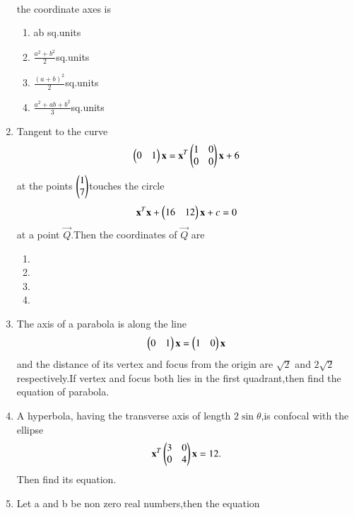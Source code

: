 \begin{enumerate}[label=\arabic*.,ref=\thesubsection.\theenumi]
\begin{align}
    \end{align} the coordinate axes is 
    \begin{enumerate}
    \item ab sq.units
    \item $\frac{a^2+b^2}{2}$sq.units 
    \item $\frac{(a+b)^2}{2}$sq.units 
    \item $\frac{a^2+ab+b^2}{3}$sq.units
    \end{enumerate}
\item Tangent to the curve
    \begin{align}
    \begin{pmatrix}0&1\end{pmatrix}\mathbf{x}= \mathbf{x}^T\begin{pmatrix}1 & 0 \\0 & 0\end{pmatrix}\mathbf{x}+ 6
    \end{align} 
    at the points $\begin{pmatrix}1 \\ 7\end{pmatrix}$touches the circle 
    \begin{align}
    \mathbf{x}^T \mathbf{x}+\begin{pmatrix}16&12\end{pmatrix}\mathbf{x}+c=0
    \end{align}at a point $\vec{Q}$.Then the coordinates of $\vec{Q}$ are 
    \begin{enumerate}
    \item {}
    \item {}
    \item {}
    \item {}
    \end{enumerate}
    \item The axis of a parabola is along the line
    \begin{align}
    \begin{pmatrix}0&1\end{pmatrix}\mathbf{x}=\begin{pmatrix}1&0\end{pmatrix}\mathbf{x}
    \end{align} and the distance of its vertex and focus from the origin are $\sqrt{2}$ and 	 $2\sqrt{2}$ respectively.If vertex and focus both lies in the first quadrant,then find the equation of parabola.
    \item A hyperbola, having the transverse axis of length $2\sin\theta$,is confocal with the  	ellipse 
    \begin{align} 
    \mathbf{x}^T\begin{pmatrix}3&0\\0&4 \end{pmatrix}\mathbf{x}=12.
    \end{align}Then find its equation.
    \item Let a and b be non zero real numbers,then the equation
    \begin{align}

\end{align}
\end{enumerate}

